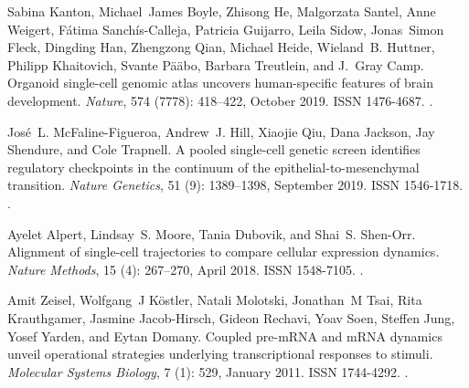 \documentclass[10pt, a4paper]{article}
\begin{document}
\begin{thebibliography}{59}
	Sabina Kanton, Michael~James Boyle, Zhisong He, Malgorzata Santel, Anne
	Weigert, F{\'a}tima {Sanch{\'i}s-Calleja}, Patricia Guijarro, Leila Sidow,
	Jonas~Simon Fleck, Dingding Han, Zhengzong Qian, Michael Heide, Wieland~B.
	Huttner, Philipp Khaitovich, Svante P{\"a}{\"a}bo, Barbara Treutlein, and
	J.~Gray Camp.
	\newblock Organoid single-cell genomic atlas uncovers human-specific features
	of brain development.
	\newblock \emph{Nature}, 574 (7778): 418--422, October 2019.
	\newblock ISSN 1476-4687.
	\newblock {}.
	
	Jos{\'e}~L. {McFaline-Figueroa}, Andrew~J. Hill, Xiaojie Qiu, Dana Jackson, Jay
	Shendure, and Cole Trapnell.
	\newblock A pooled single-cell genetic screen identifies regulatory checkpoints
	in the continuum of the epithelial-to-mesenchymal transition.
	\newblock \emph{Nature Genetics}, 51 (9): 1389--1398,
	September 2019.
	\newblock ISSN 1546-1718.
	\newblock {}.
	
	Ayelet Alpert, Lindsay~S. Moore, Tania Dubovik, and Shai~S. {Shen-Orr}.
	\newblock Alignment of single-cell trajectories to compare cellular expression
	dynamics.
	\newblock \emph{Nature Methods}, 15 (4): 267--270, April
	2018.
	\newblock ISSN 1548-7105.
	\newblock {}.
	
	Amit Zeisel, Wolfgang~J K{\"o}stler, Natali Molotski, Jonathan~M Tsai, Rita
	Krauthgamer, Jasmine {Jacob-Hirsch}, Gideon Rechavi, Yoav Soen, Steffen Jung,
	Yosef Yarden, and Eytan Domany.
	\newblock Coupled pre-{{mRNA}} and {{mRNA}} dynamics unveil operational
	strategies underlying transcriptional responses to stimuli.
	\newblock \emph{Molecular Systems Biology}, 7 (1): 529,
	January 2011.
	\newblock ISSN 1744-4292.
	\newblock {}.
	

\end{thebibliography}
\end{document}
